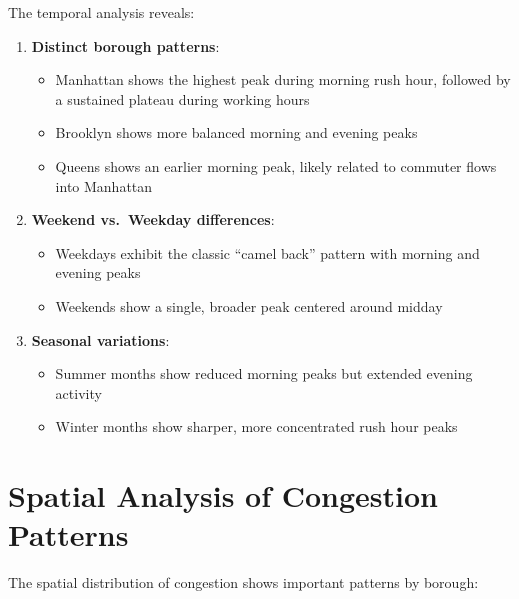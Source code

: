 \documentclass[
  letterpaper,
  DIV=11,
  numbers=noendperiod]{scrreprt}
\providecommand{\tightlist}{%
  \setlength{\itemsep}{0pt}\setlength{\parskip}{0pt}}\usepackage{longtable,booktabs,array}
\begin{document}
The temporal analysis reveals:

\begin{enumerate}
\def\labelenumi{\arabic{enumi}.}
\tightlist
\item
  \textbf{Distinct borough patterns}:

  \begin{itemize}
  \tightlist
  \item
    Manhattan shows the highest peak during morning rush hour, followed
    by a sustained plateau during working hours
  \item
    Brooklyn shows more balanced morning and evening peaks
  \item
    Queens shows an earlier morning peak, likely related to commuter
    flows into Manhattan
  \end{itemize}
\item
  \textbf{Weekend vs.~Weekday differences}:

  \begin{itemize}
  \tightlist
  \item
    Weekdays exhibit the classic ``camel back'' pattern with morning and
    evening peaks
  \item
    Weekends show a single, broader peak centered around midday
  \end{itemize}
\item
  \textbf{Seasonal variations}:

  \begin{itemize}
  \tightlist
  \item
    Summer months show reduced morning peaks but extended evening
    activity
  \item
    Winter months show sharper, more concentrated rush hour peaks
  \end{itemize}
\end{enumerate}

\section{Spatial Analysis of Congestion
Patterns}\label{spatial-analysis-of-congestion-patterns}

The spatial distribution of congestion shows important patterns by
borough:
\end{document}
